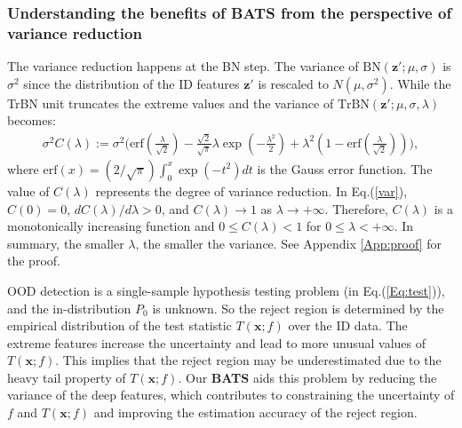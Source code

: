 \documentclass{article}
\newcommand{\benr}{\begin{eqnarray}}
\newcommand{\eenr}{\end{eqnarray}}
\def\rvx{{\mathbf{x}}}
\def\rvz{{\mathbf{z}}}
\begin{document}
\subsubsection{Understanding the benefits of BATS from the perspective of variance reduction}
The variance reduction happens at the BN step. The variance of $\text{BN}(\rvz'; \mu, \sigma)$ is $\sigma^2$ since the distribution of the ID features $\rvz'$ is rescaled to $N(\mu, \sigma^2).$
While the TrBN unit truncates the extreme values and the variance of $\text{TrBN}(\rvz'; \mu, \sigma, \lambda)$ becomes:
\benr\label{var}
\sigma^2 C(\lambda):= \sigma^2 \Big( \text{erf}(\frac{\lambda}{\sqrt 2}) - \frac{\sqrt 2}{\sqrt \pi}\lambda \exp(-\frac{\lambda^2}{2}) + \lambda^2(1-\text{erf}(\frac{\lambda}{\sqrt 2})) \Big),
\eenr
where $\text{erf}(x) = (2/\sqrt \pi) \int_0^x \exp(-t^2) dt$ is the Gauss error function.
The value of $C(\lambda)$ represents the degree of variance reduction.
In Eq.(\ref{var}), $C(0)=0$, $d C(\lambda) / d \lambda >0$, and $C(\lambda) \to 1$ as $\lambda \to +\infty.$ Therefore, $C(\lambda)$ is a monotonically increasing function and $0\leq C(\lambda)<1$ for $0\leq \lambda < +\infty.$ In summary, the smaller $\lambda$, the smaller the variance. See Appendix \ref{App:proof} for the proof.


OOD detection is a single-sample hypothesis testing problem (in Eq.(\ref{Eq:test})), and the in-distribution $P_0$ is unknown.
So the reject region is determined by the empirical distribution of the test statistic $T(\rvx; f)$ over the ID data.
The extreme features increase the uncertainty and lead to more unusual values of $T(\rvx; f).$
This implies that the reject region may be underestimated due to the heavy tail property of $T(\rvx; f).$
Our \textbf{BATS} aids this problem by reducing the variance of the deep features, which contributes to constraining the uncertainty of $f$ and $T(\rvx; f)$ and improving the estimation accuracy of the reject region. 
\end{document}
